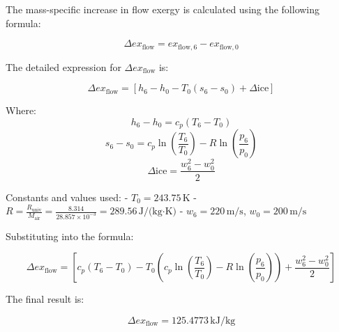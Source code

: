 The mass-specific increase in flow exergy is calculated using the following formula:  

\[
\Delta ex_{\text{flow}} = ex_{\text{flow},6} - ex_{\text{flow},0}
\]

The detailed expression for \( \Delta ex_{\text{flow}} \) is:  

\[
\Delta ex_{\text{flow}} = \left[ h_6 - h_0 - T_0 \left( s_6 - s_0 \right) + \Delta \text{ice} \right]
\]

Where:  
\[
h_6 - h_0 = c_p \left( T_6 - T_0 \right)
\]  
\[
s_6 - s_0 = c_p \ln \left( \frac{T_6}{T_0} \right) - R \ln \left( \frac{p_6}{p_0} \right)
\]  
\[
\Delta \text{ice} = \frac{w_6^2 - w_0^2}{2}
\]

Constants and values used:  
- \( T_0 = 243.75 \, \text{K} \)  
- \( R = \frac{R_{\text{univ}}}{M_{\text{air}}} = \frac{8.314}{28.857 \times 10^{-3}} = 289.56 \, \text{J/(kg·K)} \)  
- \( w_6 = 220 \, \text{m/s} \), \( w_0 = 200 \, \text{m/s} \)  

Substituting into the formula:  

\[
\Delta ex_{\text{flow}} = \left[ c_p \left( T_6 - T_0 \right) - T_0 \left( c_p \ln \left( \frac{T_6}{T_0} \right) - R \ln \left( \frac{p_6}{p_0} \right) \right) + \frac{w_6^2 - w_0^2}{2} \right]
\]

The final result is:  

\[
\Delta ex_{\text{flow}} = 125.4773 \, \text{kJ/kg}
\]